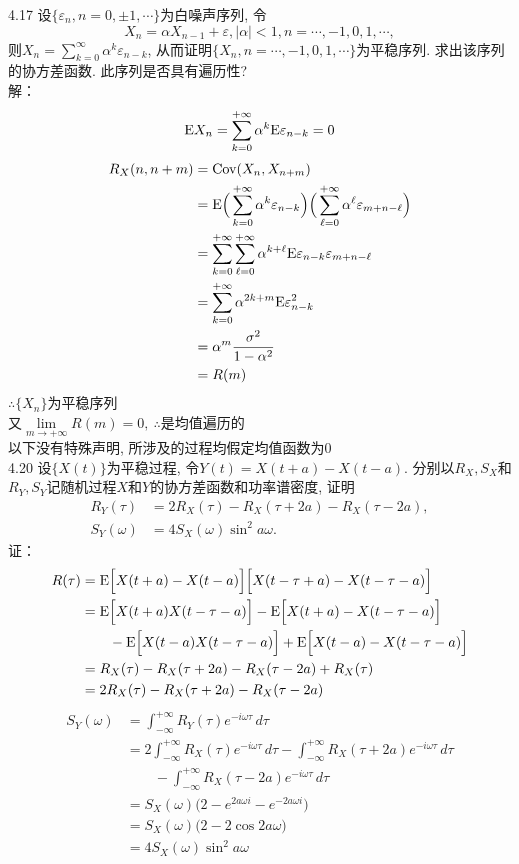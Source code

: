 4.17 设$\{\varepsilon_n, n=0,\pm1,\cdots\}$为白噪声序列, 令
\[
X_n = \alpha X_{n-1} + \varepsilon, |\alpha| < 1, n = \cdots, -1, 0, 1, \cdots,
\]
则$X_n = \sum\limits^\infty_{k=0}\alpha^k\varepsilon_{n-k}$, 从而证明$\{X_n, n = \cdots, -1, 0, 1, \cdots\}$为平稳序列. 求出该序列的协方差函数. 此序列是否具有遍历性?\\
解：
\[
\mathrm{E} X_n = \sum^{+\infty}_{k=0}\alpha^k\mathrm{E}\varepsilon_{n-k} = 0
\]
\[
\begin{split}
R_X(n, n+m) & = \mathrm{Cov}(X_n, X_{n+m})\\
			& = \mathrm{E}\Big(\sum^{+\infty}_{k=0}\alpha^k\varepsilon_{n-k}\Big)\Big(\sum^{+\infty}_{\ell=0}\alpha^\ell\varepsilon_{m+n-\ell}\Big)\\
			& = \sum^{+\infty}_{k=0}\sum^{+\infty}_{\ell=0}\alpha^{k+\ell}\mathrm{E}\varepsilon_{n-k}\varepsilon_{m+n-\ell}\\
			& = \sum^{+\infty}_{k=0}\alpha^{2k+m}\mathrm{E}\varepsilon^2_{n-k}\\
			& = \alpha^m\frac{\sigma^2}{1-\alpha^2}\\
			& = R(m)
\end{split}
\]
$\therefore \{X_n\}$为平稳序列\\
又$\lim\limits_{m\rightarrow+\infty}R(m) = 0,~\therefore$是均值遍历的\\


以下没有特殊声明, 所涉及的过程均假定均值函数为$0$\\
4.20 设$\{X(t)\}$为平稳过程, 令$Y(t) = X(t+a) - X(t-a)$. 分别以$R_X, S_X$和$R_Y, S_Y$记随机过程$X$和$Y$的协方差函数和功率谱密度, 证明
\[
\begin{split}
R_Y(\tau) & = 2R_X(\tau) - R_X(\tau + 2a) - R_X(\tau - 2a),\\
S_Y(\omega) & = 4S_X(\omega)\sin^2a\omega.
\end{split}
\]
证：
\[
\begin{split}
R(\tau) & = \mathrm{E}\Big[X(t+a)-X(t-a)\Big]\Big[X(t-\tau+a)-X(t-\tau-a)\Big]\\
		& = \mathrm{E}\Big[X(t+a)X(t-\tau-a)\Big] - \mathrm{E}\Big[X(t+a)-X(t-\tau-a)\Big]\\
		& \qquad - \mathrm{E}\Big[X(t-a)X(t-\tau-a)\Big] + \mathrm{E}\Big[X(t-a)-X(t-\tau-a)\Big]\\
		& = R_X(\tau) - R_X(\tau+2a) - R_X(\tau-2a) + R_X(\tau)\\
		& = 2R_X(\tau) - R_X(\tau+2a) - R_X(\tau-2a)
\end{split}
\]
\[
\begin{split}
S_Y(\omega) & = \int^{+\infty}_{-\infty}R_Y(\tau)e^{-i\omega\tau}\,d\tau\\
			& = 2\int^{+\infty}_{-\infty}R_X(\tau)e^{-i\omega\tau}\,d\tau - \int^{+\infty}_{-\infty}R_X(\tau+2a)e^{-i\omega\tau}\,d\tau\\
			& \qquad - \int^{+\infty}_{-\infty}R_X(\tau-2a)e^{-i\omega\tau}\,d\tau\\
			& = S_X(\omega)\big(2 - e^{2a\omega i} - e^{-2a\omega i}\big)\\
			& = S_X(\omega)\big(2 - 2\cos 2a\omega\big)\\
			& = 4S_X(\omega)\sin^2a\omega
\end{split}
\]


